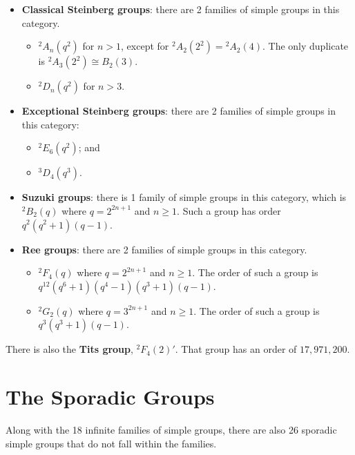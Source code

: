 \begin{itemize}
    \item \textbf{Classical Steinberg groups}: there are 2 families of simple groups in this category.
    \begin{itemize}
        \item ${^2A_n(q^2)}$ for $n > 1$, except for ${^2A_2(2^2)} = {^2A_2(4)}$. The only duplicate is ${^2A_3(2^2)} \cong B_2(3)$.
        \item ${^2D_n(q^2)}$ for $n > 3$.
    \end{itemize}
    
    \item \textbf{Exceptional Steinberg groups}: there are 2 families of simple groups in this category:
    \begin{itemize}
        \item ${^2E_6(q^2)}$; and
        \item ${^3D_4(q^3)}$.
    \end{itemize}
    
    \item \textbf{Suzuki groups}: there is 1 family of simple groups in this category, which is ${^2B_2(q)}$ where $q = 2^{2n+1}$ and $n \geq 1$. Such a group has order $q^2(q^2+1)(q-1)$.
    
    \item \textbf{Ree groups}: there are 2 families of simple groups in this category.
    \begin{itemize}
        \item $^2F_4(q)$ where $q = 2^{2n+1}$ and $n \geq 1$. The order of such a group is $q^{12}(q^6+1)(q^4-1)(q^3+1)(q-1)$.
        \item $^2G_2(q)$ where $q = 3^{2n+1}$ and $n \geq 1$. The order of such a group is $q^3(q^3+1)(q-1)$.
    \end{itemize}
\end{itemize}

There is also the \textbf{Tits group}, $^2F_4(2)'$. That group has an order of $17,971,200$.

\newpage

\section{The Sporadic Groups}
Along with the 18 infinite families of simple groups, there are also 26 sporadic simple groups that do not fall within the families.

